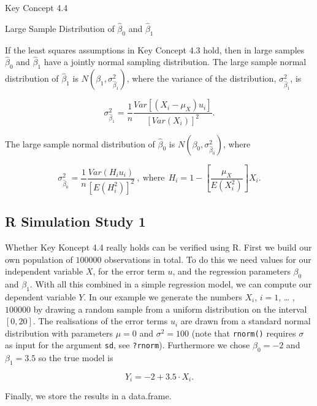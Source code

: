 \documentclass[]{book}
\theoremstyle{definition}
\theoremstyle{definition}
\theoremstyle{definition}
\theoremstyle{remark}
\begin{document}
Key Concept 4.4

Large Sample Distribution of \(\hat\beta_0\) and \(\hat\beta_1\)

If the least squares assumptions in Key Concept 4.3 hold, then in large
samples \(\hat\beta_0\) and \(\hat\beta_1\) have a jointly normal
sampling distribution. The large sample normal distribution of
\(\hat\beta_1\) is \(N(\beta_1, \sigma^2_{\hat\beta_1})\), where the
variance of the distribution, \(\sigma^2_{\hat\beta_1}\), is

\[ \sigma^2_{\hat\beta_1} = \frac{1}{n} \frac{Var \left[ \left(X_i - \mu_X \right) u_i  \right]}  {\left[  Var \left(X_i \right)  \right]^2} \tag{4.1}. \]

The large sample normal distribution of \(\hat\beta_0\) is
\(N(\beta_0, \sigma^2_{\hat\beta_0})\), where

\[ \sigma^2_{\hat\beta_0} =  \frac{1}{n} \frac{Var \left( H_i u_i \right)}{ \left[  E \left(H_i^2  \right)  \right]^2 } \ , \ \text{where} \ \ H_i = 1 - \left[ \frac{\mu_X} {E \left( X_i^2\right)} \right] X_i. \tag{4.2} \]

\subsection*{R Simulation Study 1}\label{r-simulation-study-1}

Whether Key Koncept 4.4 really holds can be verified using R. First we
build our own population of \(100000\) observations in total. To do this
we need values for our independent variable \(X\), for the error term
\(u\), and the regression parameters \(\beta_0\) and \(\beta_1\). With
all this combined in a simple regression model, we can compute our
dependent variable \(Y\). In our example we generate the numbers
\(X_i\), \(i = 1\), \ldots{} ,\(100000\) by drawing a random sample from
a uniform distribution on the interval \([0,20]\). The realisations of
the error terms \(u_i\) are drawn from a standard normal distribution
with parameters \(\mu = 0\) and \(\sigma^2 = 100\) (note that
\texttt{rnorm()} requires \(\sigma\) as input for the argument
\texttt{sd}, see \texttt{?rnorm}). Furthermore we chose \(\beta_0 = -2\)
and \(\beta_1 = 3.5\) so the true model is

\[ Y_i = -2 + 3.5 \cdot X_i. \]

Finally, we store the results in a data.frame.
\end{document}
